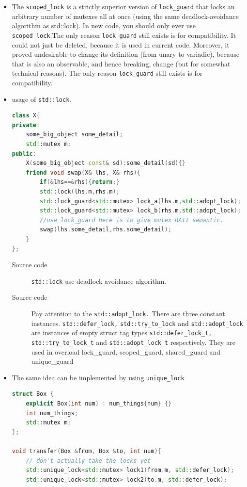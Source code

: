 \documentclass[a4paper,11pt,twoside]{book}
\begin{document}
\begin{itemize}
\item The \texttt{scoped\_lock} is a strictly superior version of \texttt{lock\_guard} that locks an arbitrary number of mutexes all at once (using the same deadlock-avoidance algorithm as std::lock). In new code, you should only ever use \texttt{scoped\_lock}.The only reason \texttt{lock\_guard} still exists is for compatibility. It could not just be deleted, because it is used in current code. Moreover, it proved undesirable to change its definition (from unary to variadic), because that is also an observable, and hence breaking, change (but for somewhat technical reasons). The only reason \texttt{lock\_guard} still exists is for compatibility. 

	\item usage of \texttt{std::lock}. 
\begin{lstlisting}[frame=single, language=c++]	
class X{
private:
	some_big_object some_detail;
	std::mutex m;
public:
	X(some_big_object const& sd):some_detail(sd){}
	friend void swap(X& lhs, X& rhs){
		if(&lhs==&rhs){return;}
		std::lock(lhs.m,rhs.m);
		std::lock_guard<std::mutex> lock_a(lhs.m,std::adopt_lock);
		std::lock_guard<std::mutex> lock_b(rhs.m,std::adopt_lock);
		//use lock_guard here is to give mutex RAII semantic.
		swap(lhs.some_detail,rhs.some_detail);
	}
};
\end{lstlisting}

\begin{description}
	\item[Source code] \texttt{std::lock} use deadlock avoidance algorithm. 
	\item[Source code] Pay attention to the \texttt{std::adopt\_lock.} There are three constant instances. \texttt{std::defer\_lock,} \texttt{std::try\_to\_lock} and \texttt{std::adopt\_lock} are instances of empty struct tag types \texttt{std::defer\_lock\_t,} \texttt{std::try\_to\_lock\_t} and \texttt{std::adopt\_lock\_t} respectively. They are used in overload lock\_guard, scoped\_guard, shared\_guard and unique\_guard
\end{description}

	\item The same idea can be implemented by using \texttt{unique\_lock}

\begin{lstlisting}[frame=single, language=c++]	
struct Box {
	explicit Box(int num) : num_things{num} {}
	int num_things;
	std::mutex m;
};

void transfer(Box &from, Box &to, int num){
	// don't actually take the locks yet
	std::unique_lock<std::mutex> lock1(from.m, std::defer_lock);
	std::unique_lock<std::mutex> lock2(to.m, std::defer_lock);
	

\end{lstlisting}
\end{itemize}
\end{document}
